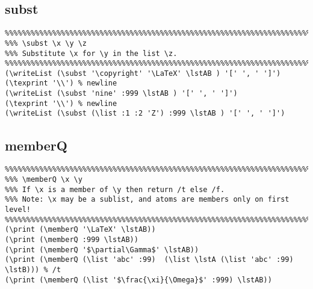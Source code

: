 \documentclass[10pt,a4paper]{article}
\begin{document}
\begin{framed}
\noindent
{}
\end{framed}

\subsection{subst}
\begin{verbatim}
%%%%%%%%%%%%%%%%%%%%%%%%%%%%%%%%%%%%%%%%%%%%%%%%%%%%%%%%%%%%%%%%%%%%%%%%%%%%%
%%% \subst \x \y \z
%%% Substitute \x for \y in the list \z.
%%%%%%%%%%%%%%%%%%%%%%%%%%%%%%%%%%%%%%%%%%%%%%%%%%%%%%%%%%%%%%%%%%%%%%%%%%%%%
(\writeList (\subst '\copyright' '\LaTeX' \lstAB ) '[' ', ' ']')
(\texprint '\\') % newline
(\writeList (\subst 'nine' :999 \lstAB ) '[' ', ' ']')
(\texprint '\\') % newline
(\writeList (\subst (\list :1 :2 'Z') :999 \lstAB ) '[' ', ' ']')
\end{verbatim}

\begin{framed}
\noindent
{}
\end{framed}

\subsection{memberQ}
\begin{verbatim}
%%%%%%%%%%%%%%%%%%%%%%%%%%%%%%%%%%%%%%%%%%%%%%%%%%%%%%%%%%%%%%%%%%%%%%%%%%%%%
%%% \memberQ \x \y
%%% If \x is a member of \y then return /t else /f. 
%%% Note: \x may be a sublist, and atoms are members only on first level!
%%%%%%%%%%%%%%%%%%%%%%%%%%%%%%%%%%%%%%%%%%%%%%%%%%%%%%%%%%%%%%%%%%%%%%%%%%%%%
(\print (\memberQ '\LaTeX' \lstAB))
(\print (\memberQ :999 \lstAB))
(\print (\memberQ '$\partial\Gamma$' \lstAB))
(\print (\memberQ (\list 'abc' :99)  (\list \lstA (\list 'abc' :99) \lstB))) % /t
(\print (\memberQ (\list '$\frac{\xi}{\Omega}$' :999) \lstAB))
\end{verbatim}
\end{document}

